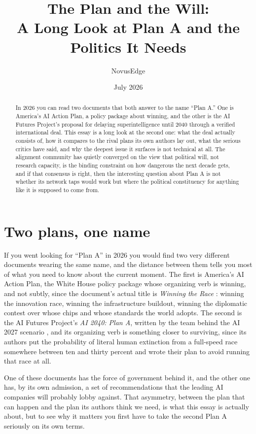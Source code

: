 \documentclass[11pt,letterpaper]{article}
\title{The Plan and the Will:\\A Long Look at Plan A and the Politics It Needs}
\author{NovusEdge}
\date{July 2026}
\begin{document}
\maketitle

\begin{abstract}
\noindent In 2026 you can read two documents that both answer to the name ``Plan A.'' One is America's AI Action Plan, a policy package about winning, and the other is the AI Futures Project's proposal for delaying superintelligence until 2040 through a verified international deal. This essay is a long look at the second one: what the deal actually consists of, how it compares to the rival plans its own authors lay out, what the serious critics have said, and why the deepest issue it surfaces is not technical at all. The alignment community has quietly converged on the view that political will, not research capacity, is the binding constraint on how dangerous the next decade gets, and if that consensus is right, then the interesting question about Plan A is not whether its network taps would work but where the political constituency for anything like it is supposed to come from.
\end{abstract}

\section{Two plans, one name}

If you went looking for ``Plan A'' in 2026 you would find two very different documents wearing the same name, and the distance between them tells you most of what you need to know about the current moment. The first is America's AI Action Plan, the White House policy package whose organizing verb is winning, and not subtly, since the document's actual title is \emph{Winning the Race} \citep{actionplan}: winning the innovation race, winning the infrastructure buildout, winning the diplomatic contest over whose chips and whose standards the world adopts. The second is the AI Futures Project's \emph{AI 2040: Plan A}, written by the team behind the AI 2027 scenario \citep{ai2040}, and its organizing verb is something closer to surviving, since its authors put the probability of literal human extinction from a full-speed race somewhere between ten and thirty percent and wrote their plan to avoid running that race at all.

One of these documents has the force of government behind it, and the other one has, by its own admission, a set of recommendations that the leading AI companies will probably lobby against. That asymmetry, between the plan that can happen and the plan its authors think we need, is what this essay is actually about, but to see why it matters you first have to take the second Plan A seriously on its own terms.
\end{document}
